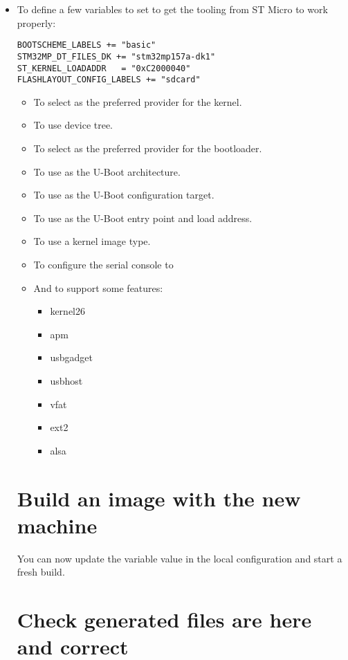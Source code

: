 \if{}
\begin{itemize}
  \item To define a few variables to set to get the tooling from ST
    Micro to work properly:
\begin{verbatim}
BOOTSCHEME_LABELS += "basic"
STM32MP_DT_FILES_DK += "stm32mp157a-dk1"
ST_KERNEL_LOADADDR   = "0xC2000040"
FLASHLAYOUT_CONFIG_LABELS += "sdcard"
\end{verbatim}
\else
\begin{itemize}
  \item To select  as the preferred provider
    for the kernel.
  \item To use  device tree.
  \item To select  as the preferred provider
    for the bootloader.
  \item To use  as the U-Boot architecture.
  \item To use  as the U-Boot
    configuration target.
  \item To use  as the U-Boot entry point and load
    address.
  \item To use a  kernel image type.
  \item To configure the serial console to 
\fi
  \item And to support some features:
    \begin{itemize}
      \item kernel26
      \item apm
      \item usbgadget
      \item usbhost
      \item vfat
      \item ext2
      \item alsa
    \end{itemize}
\end{itemize}
\section{Build an image with the new machine}

You can now update the  variable value in the local configuration
and start a fresh build.

\section{Check generated files are here and correct}


\end{itemize}
